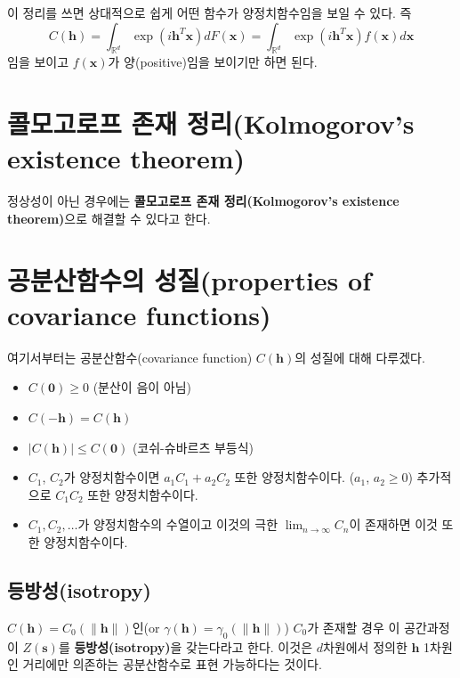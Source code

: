 \documentclass[b5paper,]{scrbook}
\theoremstyle{plain}
\theoremstyle{definition}
\numberwithin{equation}{section}
\begin{document}
이 정리를 쓰면 상대적으로 쉽게 어떤 함수가 양정치함수임을 보일 수 있다.
즉 \[
C(\mathbf{h}) =\int_{\mathbb{R}^{d}}\exp(i\mathbf{h}^{T}\mathbf{x})dF(\mathbf{x})
=\int_{\mathbb{R}^{d}}\exp(i\mathbf{h}^{T}\mathbf{x})f(\mathbf{x})d\mathbf{x}
\] 임을 보이고 \(f(\mathbf{x})\)가 양(positive)임을 보이기만 하면 된다.

\section{콜모고로프 존재 정리(Kolmogorov's existence
theorem)}\label{--kolmogorovs-existence-theorem}

정상성이 아닌 경우에는 \textbf{콜모고로프 존재 정리(Kolmogorov's
existence theorem)}으로 해결할 수 있다고 한다.

\section{공분산함수의 성질(properties of covariance
functions)}\label{-properties-of-covariance-functions}

여기서부터는 공분산함수(covariance function) \(C(\mathbf{h})\)의 성질에
대해 다루겠다.

\begin{itemize}
\item
  \(C(\mathbf{0}) \geq 0\) (분산이 음이 아님)
\item
  \(C(\mathbf{-h})=C(\mathbf{h})\)
\item
  \(|C(\mathbf{h})| \leq C(\mathbf{0})\) (코쉬-슈바르츠 부등식)
\item
  \(C_{1}\), \(C_{2}\)가 양정치함수이면 \(a_{1}C_{1}+a_{2}C_{2}\) 또한
  양정치함수이다. (\(a_{1}\), \(a_{2} \geq 0\)) 추가적으로
  \(C_{1}C_{2}\) 또한 양정치함수이다.
\item
  \(C_{1}, C_{2}, \ldots\)가 양정치함수의 수열이고 이것의 극한
  \(\lim_{n \rightarrow \infty}C_{n}\)이 존재하면 이것 또한
  양정치함수이다.
\end{itemize}

\subsection{등방성(isotropy)}\label{isotropy}

\(C(\mathbf{h})=C_{0}(\|\mathbf{h}\|)\)인(or
\(\gamma(\mathbf{h})=\gamma_{0}(\|\mathbf{h}\|)\)) \(C_{0}\)가 존재할
경우 이 공간과정이 \(Z(\mathbf{s})\)를 \textbf{등방성(isotropy)}을
갖는다라고 한다. 이것은 \(d\)차원에서 정의한 \(\mathbf{h}\) 1차원인
거리에만 의존하는 공분산함수로 표현 가능하다는 것이다.
\end{document}

